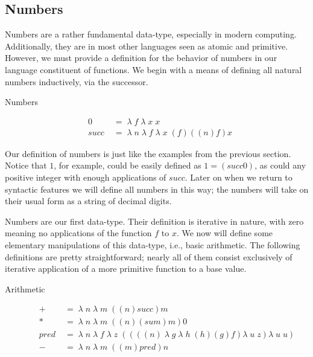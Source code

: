 \subsection{Numbers}
Numbers are a rather fundamental data-type, especially in modern computing.
Additionally, they are in most other languages seen as atomic and primitive.
However, we must provide a definition for the behavior of numbers in our language 
constituent of functions. We begin with a means of defining all natural numbers
inductively, via the successor.

Numbers
\begin{figure}[ht]
\caption{}\label{scheme}
\begin{align*}
& 0 \; &= \; \lambda \; f \; \lambda \; x \; x
\\& succ \; &= \; \lambda \; n \; \lambda \; f \; \lambda \; x \; (f)((n)f)x
\end{align*}
\end{figure}

Our definition of numbers is just like the examples from the previous section.
Notice that $1$, for example, could be easily defined as $1 = (succ 0)$, as could
any positive integer with enough applications of $succ$. Later on when we return
to syntactic features we will define all numbers in this way; the numbers will
take on their usual form as a string of decimal digits.

Numbers are our first data-type. Their definition is iterative in nature, with
zero meaning no applications of the function $f$ to $x$. We now will define some
elementary manipulations of this data-type, i.e., basic arithmetic. The following
definitions are pretty straightforward; nearly all of them consist exclusively of
iterative application of a more primitive function to a base value.

Arithmetic
\begin{figure}[ht]
\caption{}\label{scheme}
\begin{align*}
& + \; &= \; \lambda \; n \; \lambda \; m \; ((n)succ)m
\\& * \; &= \; \lambda \; n \; \lambda \; m \; ((n)(sum)m)0
\\& pred \; &= \; \lambda \; n \; \lambda \; f \; \lambda \; z \; ((((n) \; \lambda \; g \; \lambda \; h \; (h)(g)f)\lambda \; u \; z)\lambda \; u \; u)
\\& - \; &= \; \lambda \; n \; \lambda \; m \; ((m)pred)n
\end{align*}
\end{figure}

